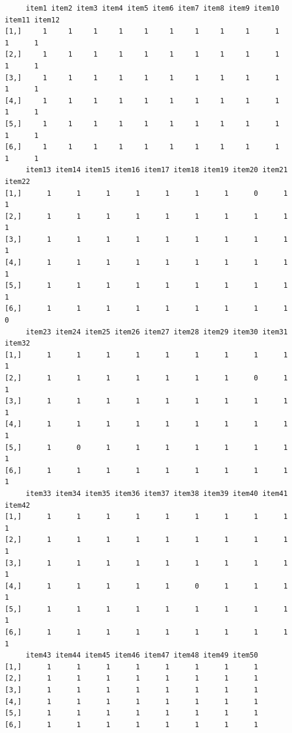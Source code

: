 \documentclass[
  a4paper,
]{ltjsbook}
\newenvironment{Shaded}{\begin{snugshade}}{\end{snugshade}}
\newcommand{\FunctionTok}[1]{\textcolor[rgb]{0.28,0.35,0.67}{#1}}
\newcommand{\NormalTok}[1]{\textcolor[rgb]{0.00,0.23,0.31}{#1}}
\newcommand{\SpecialCharTok}[1]{\textcolor[rgb]{0.37,0.37,0.37}{#1}}
\begin{document}
\begin{Shaded}
\end{Shaded}

\begin{verbatim}
     item1 item2 item3 item4 item5 item6 item7 item8 item9 item10 item11 item12
[1,]     1     1     1     1     1     1     1     1     1      1      1      1
[2,]     1     1     1     1     1     1     1     1     1      1      1      1
[3,]     1     1     1     1     1     1     1     1     1      1      1      1
[4,]     1     1     1     1     1     1     1     1     1      1      1      1
[5,]     1     1     1     1     1     1     1     1     1      1      1      1
[6,]     1     1     1     1     1     1     1     1     1      1      1      1
     item13 item14 item15 item16 item17 item18 item19 item20 item21 item22
[1,]      1      1      1      1      1      1      1      0      1      1
[2,]      1      1      1      1      1      1      1      1      1      1
[3,]      1      1      1      1      1      1      1      1      1      1
[4,]      1      1      1      1      1      1      1      1      1      1
[5,]      1      1      1      1      1      1      1      1      1      1
[6,]      1      1      1      1      1      1      1      1      1      0
     item23 item24 item25 item26 item27 item28 item29 item30 item31 item32
[1,]      1      1      1      1      1      1      1      1      1      1
[2,]      1      1      1      1      1      1      1      0      1      1
[3,]      1      1      1      1      1      1      1      1      1      1
[4,]      1      1      1      1      1      1      1      1      1      1
[5,]      1      0      1      1      1      1      1      1      1      1
[6,]      1      1      1      1      1      1      1      1      1      1
     item33 item34 item35 item36 item37 item38 item39 item40 item41 item42
[1,]      1      1      1      1      1      1      1      1      1      1
[2,]      1      1      1      1      1      1      1      1      1      1
[3,]      1      1      1      1      1      1      1      1      1      1
[4,]      1      1      1      1      1      0      1      1      1      1
[5,]      1      1      1      1      1      1      1      1      1      1
[6,]      1      1      1      1      1      1      1      1      1      1
     item43 item44 item45 item46 item47 item48 item49 item50
[1,]      1      1      1      1      1      1      1      1
[2,]      1      1      1      1      1      1      1      1
[3,]      1      1      1      1      1      1      1      1
[4,]      1      1      1      1      1      1      1      1
[5,]      1      1      1      1      1      1      1      1
[6,]      1      1      1      1      1      1      1      1
\end{verbatim}
\end{document}
